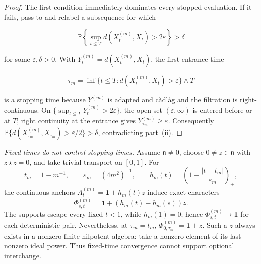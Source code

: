 \documentclass[10pt,reqno]{amsart}
\theoremstyle{plain}
\theoremstyle{definition}
\theoremstyle{remark}
\begin{document}
\begin{proof}
The first condition immediately dominates every stopped evaluation.  If it
fails, pass to and relabel a subsequence for which

\[
 {\mathbb P}\!\left\{\sup_{t\le T}d(X^{(m)}_t,X_t)>2\varepsilon\right\}
 >\delta
\]

for some \(\varepsilon,\delta>0\).  With
\(Y^{(m)}_t=d(X^{(m)}_t,X_t)\), the first entrance time

\[
 \tau_m=\inf\{t\le T:d(X^{(m)}_t,X_t)>\varepsilon\}\wedge T
\]

is a stopping time because \(Y^{(m)}\) is adapted and càdlàg and the
filtration is right-continuous.  On
\(\{\sup_{t\le T}Y^{(m)}_t>2\varepsilon\}\), the open set
\((\varepsilon,\infty)\) is entered before or at \(T\); right continuity at
the entrance gives \(Y^{(m)}_{\tau_m}\ge\varepsilon\).  Consequently
\({\mathbb P}\{d(X^{(m)}_{\tau_m},X_{\tau_m})>\varepsilon/2\}>\delta\),
contradicting part~\textup{(ii)}.
\end{proof}

\medskip
\noindent\emph{Fixed times do not control stopping times.}
Assume \(\mathfrak n\ne0\), choose \(0\ne z\in\mathfrak n\) with
\(z\star z=0\), and take trivial transport on \([0,1]\).  For
\[
 t_m=1-m^{-1},\qquad \varepsilon_m=(4m^2)^{-1},\qquad
 h_m(t)=\left(1-\frac{|t-t_m|}{\varepsilon_m}\right)_+,
\]
the continuous anchors \(A^{(m)}_t={\mathbf 1}+h_m(t)z\) induce exact characters
\[
 \Phi^{(m)}_{s,t}={\mathbf 1}+(h_m(t)-h_m(s))z.
\]
The supports escape every fixed \(t<1\), while \(h_m(1)=0\); hence
\(\Phi^{(m)}_{s,t}\to{\mathbf 1}\) for each deterministic pair.  Nevertheless,
at \(\tau_m=t_m\),
\(\Phi^{(m)}_{0,\tau_m}={\mathbf 1}+z\).  Such a \(z\) always exists in a
nonzero finite nilpotent algebra: take a nonzero element of its last
nonzero ideal power.  Thus fixed-time convergence cannot support optional
interchange.
\medskip
\end{document}

